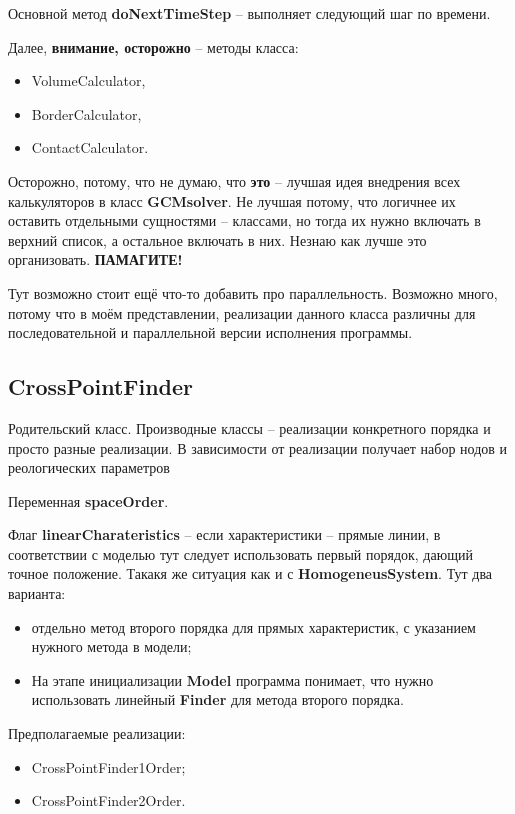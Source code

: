 \documentclass[a4paper,12pt]{article}
\numberwithin{equation}{section}
\begin{document}
	Основной метод \textbf{doNextTimeStep} -- выполняет следующий шаг по времени.
	
	Далее, \textbf{внимание, осторожно} -- методы класса:
	\begin{itemize}
		\item{VolumeCalculator,}
		\item{BorderCalculator,}
		\item{ContactCalculator.}
	\end{itemize}
	Осторожно, потому, что не думаю, что \textbf{это} -- лучшая идея внедрения всех калькуляторов в класс \textbf{GCMsolver}.
	Не лучшая потому, что логичнее их оставить отдельными сущностями -- классами, но тогда их нужно включать в верхний список, а остальное включать в них. Незнаю как лучше это организовать.
	\textbf{ПАМАГИТЕ!}
	
	Тут возможно стоит ещё что-то добавить про параллельность. Возможно много, потому что в моём представлении, реализации данного класса различны для последовательной и параллельной версии исполнения программы.

\subsection{CrossPointFinder}
	Родительский класс. Производные классы -- реализации конкретного порядка и просто разные реализации.
	В зависимости от реализации получает набор нодов и реологических параметров
	
	Переменная \textbf{spaceOrder}.
	
	Флаг \textbf{linearCharateristics} -- если характеристики -- прямые линии, в соответствии с моделью тут следует использовать первый порядок, дающий точное положение. Такакя же ситуация как и с \textbf{HomogeneusSystem}.
	Тут два варианта: 
		\begin{itemize}
			\item{отдельно метод второго порядка для прямых характеристик, с указанием нужного метода в модели;}
			\item{На этапе инициализации \textbf{Model} программа понимает, что нужно использовать линейный \textbf{Finder} для метода второго порядка.}
		\end{itemize}

	Предполагаемые реализации:
		\begin{itemize}
			\item{CrossPointFinder1Order;}
			\item{CrossPointFinder2Order.}
		\end{itemize}
\end{document}
